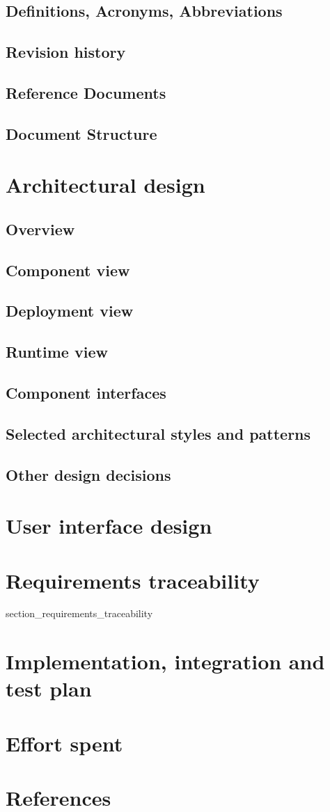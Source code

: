 \documentclass[a4paper]{article}
\begin{document}
\subsection{Definitions, Acronyms, Abbreviations}
\subsection{Revision history}
\subsection{Reference Documents}
\subsection{Document Structure}

\newpage
\section{Architectural design}

\subsection{Overview}
\subsection{Component view}
\subsection{Deployment view}
\subsection{Runtime view}
\subsection{Component interfaces}
\subsection{Selected architectural styles and patterns}
\subsection{Other design decisions}

\newpage
\section{User interface design}

\newpage
\section{Requirements traceability}
{section_requirements_traceability}



\newpage
\section{Implementation, integration and test plan}
\newpage
\section{Effort spent}
\section{References}
\end{document}
